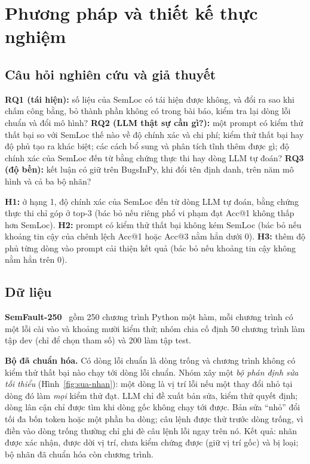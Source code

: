 \chapter{Phương pháp và thiết kế thực nghiệm}
\label{chap:phuong-phap}

\section{Câu hỏi nghiên cứu và giả thuyết}
\label{sec:rq}

\textbf{RQ1 (tái hiện):} số liệu của SemLoc có tái hiện được không, và đổi ra sao khi chấm công bằng, bỏ thành phần
không có trong bài báo, kiểm tra lại dòng lỗi chuẩn và đổi mô hình? \textbf{RQ2 (LLM thật sự cần gì?):} một prompt có
kiểm thử thất bại so với SemLoc thế nào về độ chính xác và chi phí; kiểm thử thất bại hay độ phủ tạo ra khác biệt; các
cách bổ sung và phân tích tĩnh thêm được gì; độ chính xác của SemLoc đến từ bằng chứng thực thi hay dòng LLM tự đoán?
\textbf{RQ3 (độ bền):} kết luận có giữ trên BugsInPy, khi đổi tên định danh, trên năm mô hình và cả ba bộ nhãn?

\textbf{H1:} ở hạng 1, độ chính xác của SemLoc đến từ dòng LLM tự đoán, bằng chứng thực thi chỉ góp ở top-3 (bác bỏ nếu
riêng phổ vi phạm đạt Acc@1 không thấp hơn SemLoc). \textbf{H2:} prompt có kiểm thử thất bại không kém SemLoc (bác bỏ nếu
khoảng tin cậy của chênh lệch Acc@1 hoặc Acc@3 nằm hẳn dưới 0). \textbf{H3:} thêm độ phủ từng dòng vào prompt cải thiện
kết quả (bác bỏ nếu khoảng tin cậy không nằm hẳn trên 0).

\section{Dữ liệu}
\label{sec:du-lieu}

\textbf{SemFault-250}~\cite{yang2026semloc} gồm 250 chương trình Python một hàm, mỗi chương trình có một lỗi cài vào và
khoảng mười kiểm thử; nhóm chia cố định 50 chương trình làm tập dev (chỉ để chọn tham số) và 200 làm tập test.

\textbf{Bộ đã chuẩn hóa.} Có \GtBlankN{} dòng lỗi chuẩn là dòng trống và \GtNotExecutedN{} chương trình không có kiểm
thử thất bại nào chạy tới dòng lỗi chuẩn. Nhóm xây một \emph{bộ phán định sửa tối thiểu} (Hình~\ref{fig:sua-nhan}): một
dòng là vị trí lỗi nếu một thay đổi nhỏ tại dòng đó làm \emph{mọi} kiểm thử đạt. LLM chỉ đề xuất bản sửa, kiểm thử quyết
định; dòng lân cận chỉ được tìm khi dòng gốc không chạy tới được. Bản sửa ``nhỏ'' đổi tối đa bốn token hoặc một phần ba
dòng; câu lệnh được thử trước dòng trống, vì điền vào dòng trống thường chỉ ghi đè câu lệnh lỗi ngay trên nó. Kết quả: \GtConfirmedN{} nhãn được xác nhận,
\GtCorrectedN{} được dời vị trí, \GtUnverifiedN{} chưa kiểm chứng được (giữ vị trí gốc) và \GtUnverifiableN{} bị loại;
bộ nhãn đã chuẩn hóa còn \GtRepairedN{} chương trình.

